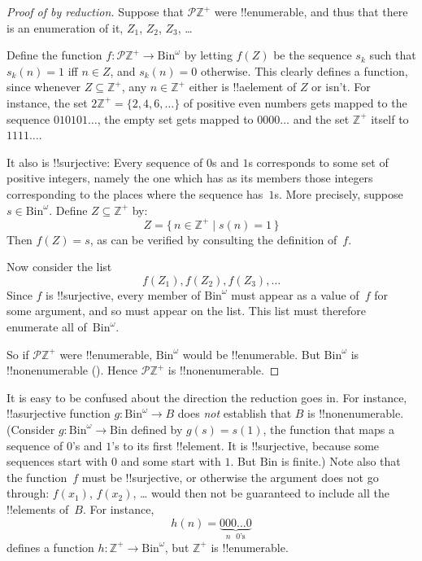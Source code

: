 \documentclass[10pt,a4paper]{article}
\makeatletter
\theoremstyle{plain}
\theoremstyle{definition}
\theoremstyle{remark}
\newenvironment{explain}{}{}
\newcommand{\olref}{\@ifnextchar[{\olref@i}{\olref@final}}
\def\olref@i[#1]{\@ifnextchar[{\olref@ii}{\olref@final}}
\def\olref@ii[#1]{\@ifnextchar[{\olref@iii}{\olref@final}}
\def\olref@iii[#1]{\olref@final}
\def\olref@final#1{\ref{#1}}
\providecommand{\PosInt}{\mathbb{Z}^{+}}
\providecommand{\Bin}{\mathrm{Bin}}
\providecommand{\Pow}{\mathcal{P}}
\providecommand{\Setabs}[2]{\{\, #1 \mid #2 \,\}}
\makeatother
\begin{document}
\begin{proof}[Proof of {\olref[nen]{thm:nonenum-pownat}} by reduction]
Suppose that $\Pow{\PosInt}$ were !!{enumerable}, and thus that
there is an enumeration of it, $Z_{1}$, $Z_{2}$, $Z_{3}$, \dots

Define the function $f \colon \Pow{\PosInt} \to \Bin^\omega$ by letting
$f(Z)$ be the sequence $s_{k}$ such that $s_{k}(n) = 1$ iff $n \in Z$,
and $s_k(n) = 0$ otherwise.  This clearly defines a function, since
whenever $Z \subseteq \PosInt$, any $n \in \PosInt$ either is
!!a{element} of $Z$ or isn't.  For instance, the set $2\PosInt = \{2,
4, 6, \dots\}$ of positive even numbers gets mapped to the sequence
$010101\dots$, the empty set gets mapped to $0000\dots$ and the set
$\PosInt$ itself to $1111\dots$.

It also is !!{surjective}: Every sequence of $0$s and $1$s corresponds
to some set of positive integers, namely the one which has as its
members those integers corresponding to the places where the sequence
has~$1$s. More precisely, suppose $s \in \Bin^\omega$.  Define $Z
\subseteq \PosInt$ by:
\[
Z = \Setabs{n \in \PosInt}{s(n) = 1}
\]
Then $f(Z) = s$, as can be verified by consulting the definition
of~$f$.

Now consider the list
\[
f(Z_1), f(Z_2), f(Z_3), \dots
\]
Since $f$ is !!{surjective}, every member of $\Bin^\omega$ must
appear as a value of~$f$ for some argument, and so must appear on the
list. This list must therefore enumerate all of~$\Bin^\omega$.

So if $\Pow{\PosInt}$ were !!{enumerable}, $\Bin^\omega$ would be
!!{enumerable}.  But $\Bin^\omega$ is !!{nonenumerable}
(\olref[nen]{thm:nonenum-bin-omega}). Hence $\Pow{\PosInt}$ is
!!{nonenumerable}.
\end{proof}

\begin{explain}
It is easy to be confused about the direction the reduction goes in.
For instance, !!a{surjective} function $g \colon \Bin^\omega \to B$
does \emph{not} establish that $B$ is !!{nonenumerable}.  (Consider $g
\colon \Bin^\omega \to \Bin$ defined by $g(s) = s(1)$, the function
that maps a sequence of $0$'s and $1$'s to its first !!{element}.  It
is !!{surjective}, because some sequences start with $0$ and some start
with $1$. But $\Bin$ is finite.)  Note also that the function~$f$ must
be !!{surjective}, or otherwise the argument does not go through:
$f(x_1)$, $f(x_2)$, \dots{} would then not be guaranteed to include
all the !!{element}s of~$B$. For instance, 
\[
h(n) = \underbrace{000\dots0}_{\text{$n$ $0$'s}}
\]
defines a function $h\colon \PosInt \to
\Bin^\omega$, but $\PosInt$ is !!{enumerable}.
\end{explain}
\end{document}
